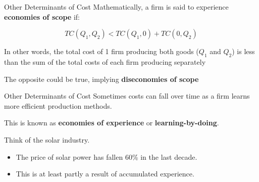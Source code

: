 \documentclass{beamer}
\begin{document}
\begin{frame}{Other Determinants of Cost}
  Mathematically, a firm is said to experience \textbf{economies of scope} if:

  $$
    TC(Q_1,Q_2) < TC(Q_1,0) + TC(0, Q_2)
  $$

  \bigskip
  In other words, the total cost of 1 firm producing both goods ($Q_1$ and $Q_2$) is less than the sum of the total costs of each firm producing separately

  \bigskip
  The opposite could be true, implying \textbf{diseconomies of scope}
\end{frame}

\begin{frame}{Other Determinants of Cost}
  Sometimes costs can fall over time as a firm learns more efficient production methods.

  This is known as \textbf{economies of experience} or \textbf{learning-by-doing}.

  \bigskip
  Think of the solar industry.
  \begin{itemize}
    \item The price of solar power has fallen 60\% in the last decade.
 
    \item This is at least partly a result of accumulated experience.
  \end{itemize}
\end{frame}
\end{document}
